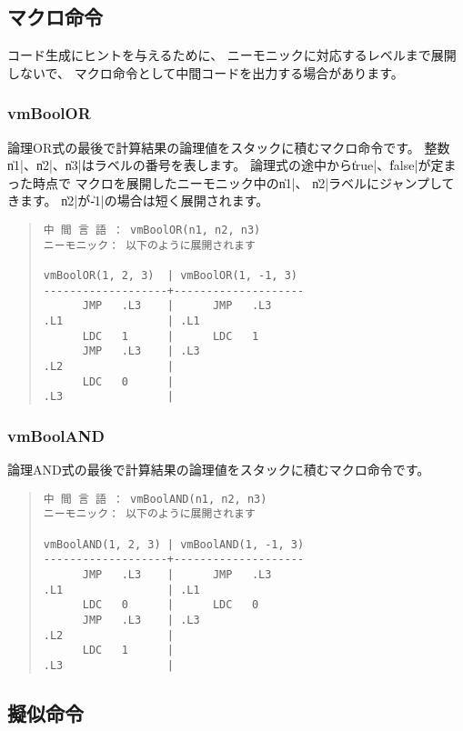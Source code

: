 \subsection{マクロ命令}

コード生成にヒントを与えるために、
ニーモニックに対応するレベルまで展開しないで、
マクロ命令として中間コードを出力する場合があります。

\subsubsection{vmBoolOR}

論理OR式の最後で計算結果の論理値をスタックに積むマクロ命令です。
整数\|n1|、\|n2|、\|n3|はラベルの番号を表します。
論理式の途中から\|true|、\|false|が定まった時点で
マクロを展開したニーモニック中の\|n1|、
\|n2|ラベルにジャンプしてきます。
\|n2|が\|-1|の場合は短く展開されます。

\begin{quote}
\begin{verbatim}
中 間 言 語 ： vmBoolOR(n1, n2, n3)
ニーモニック： 以下のように展開されます

vmBoolOR(1, 2, 3)  | vmBoolOR(1, -1, 3)
-------------------+--------------------
      JMP   .L3    |      JMP   .L3
.L1                | .L1
      LDC   1      |      LDC   1
      JMP   .L3    | .L3
.L2                |
      LDC   0      |
.L3                |
\end{verbatim}
\end{quote}

\subsubsection{vmBoolAND}

論理AND式の最後で計算結果の論理値をスタックに積むマクロ命令です。

\begin{quote}
\begin{verbatim}
中 間 言 語 ： vmBoolAND(n1, n2, n3)
ニーモニック： 以下のように展開されます

vmBoolAND(1, 2, 3) | vmBoolAND(1, -1, 3)
-------------------+--------------------
      JMP   .L3    |      JMP   .L3
.L1                | .L1
      LDC   0      |      LDC   0
      JMP   .L3    | .L3
.L2                |
      LDC   1      |
.L3                |
\end{verbatim}
\end{quote}

\subsection{擬似命令}

